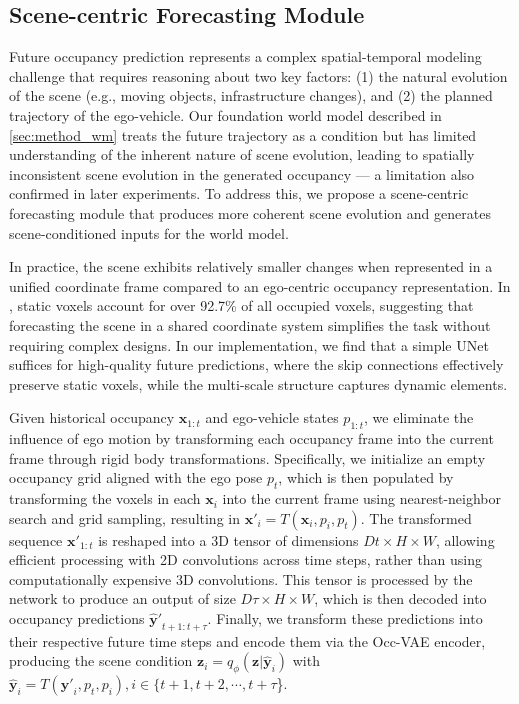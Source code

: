 \subsection{Scene-centric Forecasting Module}\label{sec:method_sfm}
Future occupancy prediction represents a complex spatial-temporal modeling challenge that requires reasoning about two key factors: (1) the natural evolution of the scene (e.g., moving objects, infrastructure changes), and (2) the planned trajectory of the ego-vehicle. 
Our foundation world model described in \cref{sec:method_wm} treats the future trajectory as a condition but has limited understanding of the inherent nature of scene evolution, leading to spatially inconsistent scene evolution in the generated occupancy — a limitation also confirmed in later experiments. 
To address this, we propose a scene-centric forecasting module that produces more coherent scene evolution and generates scene-conditioned inputs for the world model.


In practice, the scene exhibits relatively smaller changes when represented in a unified coordinate frame compared to an ego-centric occupancy representation. 
In \occnus{}, static voxels account for over 92.7\% of all occupied voxels, suggesting that forecasting the scene in a shared coordinate system simplifies the task without requiring complex designs. 
In our implementation, we find that a simple UNet~\cite{unet} suffices for high-quality future predictions, where the skip connections effectively preserve static voxels, while the multi-scale structure captures dynamic elements.

Given historical occupancy $\mathbf{x}_{1:t}$ and ego-vehicle states $p_{1:t}$,  we eliminate the influence of ego motion by transforming each occupancy frame into the current frame  through rigid body transformations. 
Specifically, we initialize an empty occupancy grid aligned with the ego pose $p_t$, which is then populated by transforming the voxels in each $\mathbf{x}_i$ into the current frame using nearest-neighbor search and grid sampling, resulting in $\mathbf{x}'_i = T(\mathbf{x}_i, p_i, p_t)$.
The transformed sequence $\mathbf{x}'_{1:t}$ is reshaped into a 3D tensor of dimensions $Dt \times H \times W $, allowing efficient processing with 2D convolutions across time steps, rather than using computationally expensive 3D convolutions.
This tensor is processed by the network to produce an output of size $D\tau \times H \times W$, which is then decoded into occupancy predictions $\mathbf{\hat{y}'}_{t+1:t+\tau}$.
Finally, we transform these predictions into their respective future time steps and encode them via the Occ-VAE encoder, producing the scene condition $\mathbf{z}_i = q_{\phi}(\mathbf{z}|\mathbf{\hat{y}}_i)$ with $\mathbf{\hat{y}}_{i} = T(\mathbf{\hat y'}_{i}, p_t, p_{i}), i \in\{ t+1, t+2, \cdots, t+\tau$\}.


